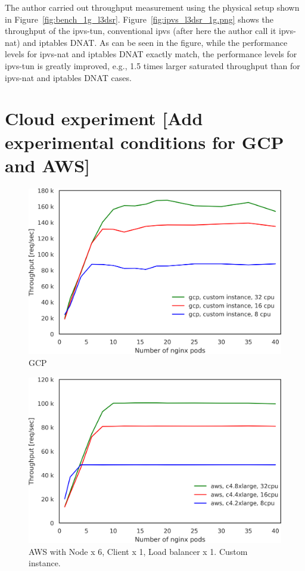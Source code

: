 The author carried out throughput measurement using the physical setup shown in Figure~\ref{fig:bench_1g_l3dsr}.
Figure~\ref{fig:ipvs_l3dsr_1g.png} shows the throughput of the ipvs-tun, conventional ipvs (after here the author call it ipvs-nat) and iptables DNAT.
As can be seen in the figure, while the performance levels for ipvs-nat and iptables DNAT exactly match, the performance levels for ipvs-tun is greatly improved, e.g., 1.5 times larger saturated throughput than for ipvs-nat and iptables DNAT cases.

\FloatBarrier

\section{Cloud experiment
  [Add experimental conditions for GCP and AWS]
}

\begin{figure}[t]
  \centering
  \includegraphics[width=0.8\columnwidth]{Figs/gcp_all_tp}
  \caption{GCP}
  \label{fig:gcp_all_ieice}
\end{figure}

\begin{figure}[t]
  \centering
  \includegraphics[width=0.8\columnwidth]{Figs/aws_c4_tp}
  \caption{AWS with Node x 6, Client x 1, Load balancer x 1. Custom instance. }
  \label{fig:aws_c4_ieice}
\end{figure}

